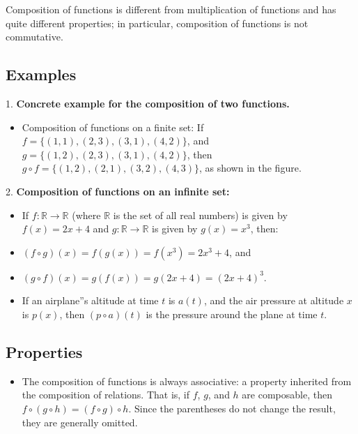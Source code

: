 Composition of functions is different from multiplication of functions and has quite
different properties; in particular, composition of functions is not commutative.

\subsection{Examples}
\label{sss:exam-bfeb}

1. \textbf{Concrete example for the composition of two functions.}


\begin{itemize}
    \item Composition of functions on a finite set: If $f = \{(1, 1), (2, 3), (3, 1), (4, 2)\}$, and $g = \{(1, 2), (2, 3), (3, 1), (4, 2)\}$, then $g \circ f = \{(1, 2), (2, 1), (3, 2), (4, 3)\}$, as shown in the figure.
\end{itemize}

2. \textbf{Composition of functions on an infinite set:}

\begin{itemize}
    \item If $f : \mathbb{R} \to \mathbb{R}$ (where $\mathbb{R}$ is the set of all real numbers) is given by $f(x) = 2x + 4$ and $g : \mathbb{R} \to \mathbb{R}$ is given by $g(x) = x^3$, then:
    \item $(f \circ g)(x) = f(g(x)) = f(x^3) = 2x^3 + 4$, and
    \item $(g \circ f)(x) = g(f(x)) = g(2x + 4) = (2x + 4)^3$.
    \item If an airplane''s altitude at time $t$ is $a(t)$, and the air pressure at altitude $x$ is $p(x)$, then $(p \circ a)(t)$ is the pressure around the plane at time $t$.
\end{itemize}

\subsection{Properties}
\label{sss:prop-7469}

\begin{itemize}
    \item The composition of functions is always associative: a property inherited from the composition of relations. That is, if $f$, $g$, and $h$ are composable, then $f \circ (g \circ h) = (f \circ g) \circ h$. Since the parentheses do not change the result, they are generally omitted.
\end{itemize}

